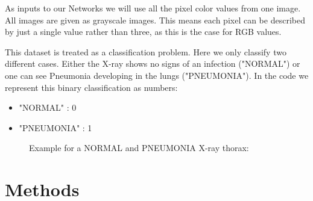\documentclass{article}
\begin{document}
As inputs to our Networks we will use all the pixel color values from one image. 
All images are given as grayscale images. This means each pixel can be described by just a 
single value rather than three, as this is the case for RGB values.

This dataset is treated as a classification problem. Here we only classify two different cases. 
Either the X-ray shows no signs of an infection ("NORMAL") or one can see Pneumonia 
developing in the lungs ("PNEUMONIA"). In the code we represent this binary classification as numbers:

\begin{itemize}
  \item "NORMAL" : 0
  \item "PNEUMONIA" : 1
\end{itemize}

\begin{figure}[h]
  \centering
  \centering
  \caption{Example for a NORMAL and PNEUMONIA X-ray thorax:}
  \label{fig:thorax_xRay_example}
\end{figure}


\section{Methods}
\end{document}
